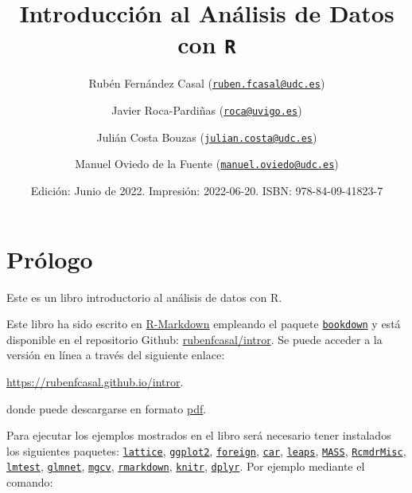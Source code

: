 \documentclass[
]{book}
\title{Introducción al Análisis de Datos con \texttt{R}}
\author{Rubén Fernández Casal (\href{mailto:ruben.fcasal@udc.es}{\nolinkurl{ruben.fcasal@udc.es}}) \and Javier Roca-Pardiñas (\href{mailto:roca@uvigo.es}{\nolinkurl{roca@uvigo.es}}) \and Julián Costa Bouzas (\href{mailto:julian.costa@udc.es}{\nolinkurl{julian.costa@udc.es}}) \and Manuel Oviedo de la Fuente (\href{mailto:manuel.oviedo@udc.es}{\nolinkurl{manuel.oviedo@udc.es}})}
\date{Edición: Junio de 2022. Impresión: 2022-06-20. ISBN: 978-84-09-41823-7}
\theoremstyle{break}
\begin{document}
\maketitle

{
\setcounter{tocdepth}{1}
\tableofcontents
}
\hypertarget{pruxf3logo}{%
\chapter*{Prólogo}\label{pruxf3logo}}

Este es un libro introductorio al análisis de datos con R.

Este libro ha sido escrito en \href{http://rmarkdown.rstudio.com}{R-Markdown} empleando el paquete \href{https://bookdown.org/yihui/bookdown/}{\texttt{bookdown}} y está disponible en el repositorio Github: \href{https://github.com/rubenfcasal/book_remuestreo}{rubenfcasal/intror}.
Se puede acceder a la versión en línea a través del siguiente enlace:

\url{https://rubenfcasal.github.io/intror}.

donde puede descargarse en formato \href{https://rubenfcasal.github.io/intror/Intro_Analisis_Datos_R.pdf}{pdf}.

Para ejecutar los ejemplos mostrados en el libro será necesario tener instalados los siguientes paquetes:
\href{https://cran.r-project.org/web/packages/lattice/index.html}{\texttt{lattice}},
\href{https://cran.r-project.org/web/packages/ggplot2/index.html}{\texttt{ggplot2}},
\href{https://cran.r-project.org/web/packages/foreign/index.html}{\texttt{foreign}},
\href{https://cran.r-project.org/web/packages/car/index.html}{\texttt{car}},
\href{https://cran.r-project.org/web/packages/leaps/index.html}{\texttt{leaps}},
\href{https://cran.r-project.org/web/packages/MASS/index.html}{\texttt{MASS}},
\href{https://cran.r-project.org/web/packages/RcmdrMisc/index.html}{\texttt{RcmdrMisc}},
\href{https://cran.r-project.org/web/packages/lmtest/index.html}{\texttt{lmtest}},
\href{https://cran.r-project.org/web/packages/glmnet/index.html}{\texttt{glmnet}},
\href{https://cran.r-project.org/web/packages/mgcv/index.html}{\texttt{mgcv}},
\href{https://cran.r-project.org/web/packages/rmarkdown/index.html}{\texttt{rmarkdown}},
\href{https://cran.r-project.org/web/packages/knitr/index.html}{\texttt{knitr}},
\href{https://cran.r-project.org/web/packages/dplyr/index.html}{\texttt{dplyr}}.
Por ejemplo mediante el comando:
\end{document}
